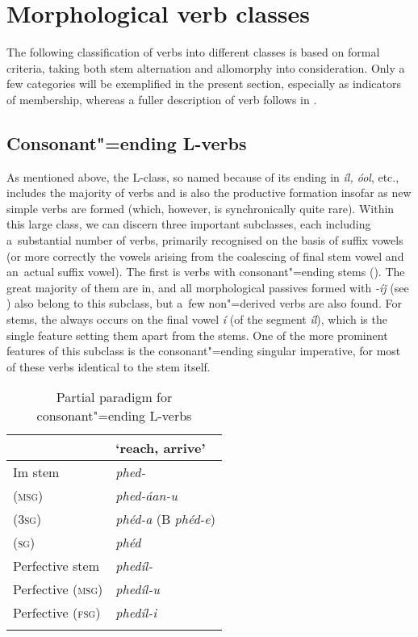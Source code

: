 \section{Morphological verb classes}
\label{sec:8-3}

\largerpage
The following classification of verbs into different classes is based on formal criteria, taking both stem alternation and  allomorphy into consideration. Only a few  categories will be exemplified in the present section, especially as indicators of  membership, whereas a fuller description of verb  follows in .


\subsection{Consonant"=ending L-verbs}
\label{subsec:8-3-1}


As mentioned above, the L-class, so named because of its  ending in \textit{íl, óol}, etc., includes the majority of verbs and is also the productive formation insofar as new simple verbs are formed (which, however, is synchronically quite rare). Within this large class, we can discern three important subclasses, each including a~substantial number of verbs, primarily recognised on the basis of suffix vowels (or more correctly the vowels arising from the coalescing of final stem vowel and an~actual suffix vowel). The first is verbs with consonant"=ending stems (). The great majority of them are in, and all morphological passives formed with \textit{-íǰ} (see ) also belong to this subclass, but a~few non"=derived  verbs are also found. For  stems, the  always occurs on the final vowel \textit{í} (of the segment \textit{íl}), which is the single feature setting them apart from the  stems. One of the more prominent features of this subclass is the consonant"=ending singular imperative, for most of these verbs identical to the stem itself.


\begin{table}[ht]
\caption{Partial paradigm for consonant"=ending L-verbs}
\begin{tabularx}{.75\textwidth}{ Q Q }
\lsptoprule
&
`reach, arrive'\\\midrule
Im stem &
\textit{phed-} \\
 (\textsc{msg}) &
\textit{phed-áan-u} \\
 (\textsc{3sg}) &
\textit{phéd-a} (B \textit{phéd-e}) \\
 (\textsc{sg}) &
\textit{phéd} \\
Perfective stem &
\textit{phedíl-} \\
Perfective (\textsc{msg}) &
\textit{phedíl-u} \\
Perfective (\textsc{fsg}) &
\textit{phedíl-i} \\\lspbottomrule
\end{tabularx}
\label{tab:8-4}
\end{table}

